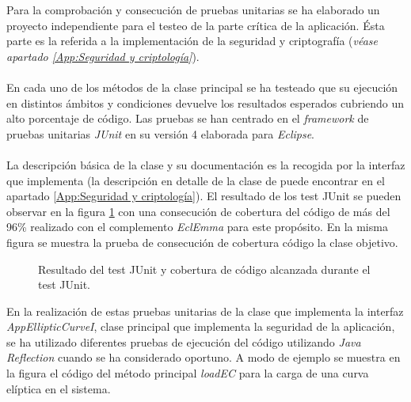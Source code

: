 \documentclass[../PFC.tex]{subfiles}
\begin{document}
Para la comprobación y consecución de pruebas unitarias se ha elaborado un proyecto independiente para el testeo de la parte crítica de la aplicación. Ésta parte es la referida a la implementación de la seguridad y criptografía (\textit{véase apartado \ref{App:Seguridad y criptología}}).
\\\\
En cada uno de los métodos de la clase principal se ha testeado que su ejecución en distintos ámbitos y condiciones devuelve los resultados esperados cubriendo un alto porcentaje de código. Las pruebas se han centrado en el \textit{framework} de pruebas unitarias \textit{JUnit}\cite{junit} en su versión 4 elaborada para \textit{Eclipse}\cite{eclipse}.
\\\\
La descripción básica de la clase y su documentación es la recogida por la interfaz que implementa (la descripción en detalle de la clase de puede encontrar en el apartado \ref{App:Seguridad y criptología}). El resultado de los test JUnit se pueden observar en la figura \ref{img:junitTest} con una consecución de cobertura del código de más del 96\% realizado con el complemento \textit{EclEmma}\cite{eclemma} para este propósito. En la misma figura se muestra la prueba de consecución de cobertura código la clase objetivo. 

\begin{figure}[H]
  \centering
  \null\hfill
  \caption{Resultado del test JUnit y cobertura de código alcanzada durante el test JUnit.}
  \label{img:junitTest}
\end{figure}

En la realización de estas pruebas unitarias de la clase que implementa la interfaz \textit{AppEllipticCurveI}, clase principal que implementa la seguridad de la aplicación, se ha utilizado diferentes pruebas de ejecución del código utilizando \textit{Java Reflection}\cite{javaReflection} cuando se ha considerado oportuno. A modo de ejemplo se muestra en la figura el código del método principal \textit{loadEC} para la carga de una curva elíptica en el sistema.
\end{document}
